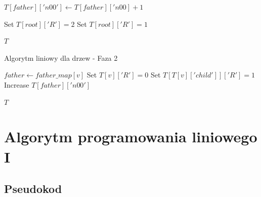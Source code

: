 \begin{algorithm}
\begin{algorithmic}[1]
                        \State $T[father]['n00'] \gets T[father]['n00] + 1$
                    \EndIf

                \EndIf
            \EndFor
    
                \State Set $T[root]['R'] = 2$
            \EndIf
                \State Set $T[root]['R'] = 1$
            \EndIf
    
            \State \Return $T$
        \EndFunction
    \end{algorithmic}
    \end{algorithm}
    
    \begin{algorithm}
    \caption*{Algorytm liniowy dla drzew - Faza 2}
    \begin{algorithmic}[1]
                \State $father \gets father\_map[v]$
                        \State Set $T[v]['R'] = 0$
                        \State Set $T[T[v]['child']]['R'] = 1$
                        \State Increase $T[father]['n00']$
                    \EndIf
                \EndIf
            \EndFor
    
            \State \Return $T$
        \EndFunction
    \end{algorithmic}
\end{algorithm}

\section{Algorytm programowania liniowego I}
\subsection{Pseudokod}

